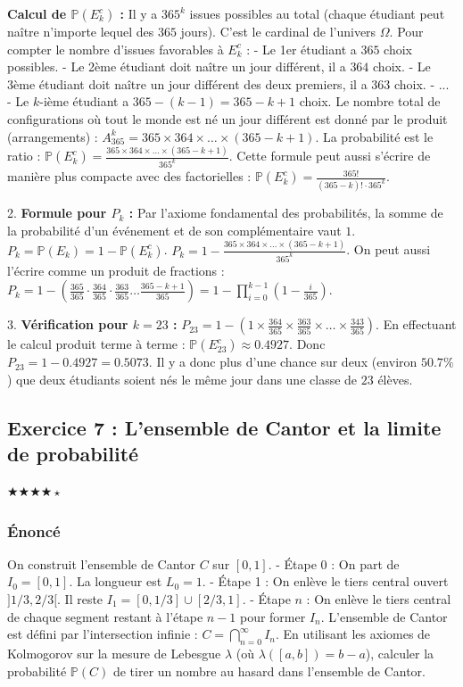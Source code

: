 \documentclass[11pt,a4paper]{article}
\begin{document}
\textbf{Calcul de $\mathbb{P}(E_k^c)$ :}
Il y a $365^k$ issues possibles au total (chaque étudiant peut naître n'importe lequel des $365$ jours). C'est le cardinal de l'univers $\Omega$.
Pour compter le nombre d'issues favorables à $E_k^c$ :
- Le 1er étudiant a $365$ choix possibles.
- Le 2ème étudiant doit naître un jour différent, il a $364$ choix.
- Le 3ème étudiant doit naître un jour différent des deux premiers, il a $363$ choix.
- ...
- Le $k$-ième étudiant a $365 - (k - 1) = 365 - k + 1$ choix.
Le nombre total de configurations où tout le monde est né un jour différent est donné par le produit (arrangements) : $A_{365}^k = 365 \times 364 \times \dots \times (365 - k + 1)$.
La probabilité est le ratio :
$\mathbb{P}(E_k^c) = \frac{365 \times 364 \times \dots \times (365 - k + 1)}{365^k}$.
Cette formule peut aussi s'écrire de manière plus compacte avec des factorielles :
$\mathbb{P}(E_k^c) = \frac{365!}{(365-k)! \cdot 365^k}$.

2. \textbf{Formule pour $P_k$ :}
Par l'axiome fondamental des probabilités, la somme de la probabilité d'un événement et de son complémentaire vaut $1$.
$P_k = \mathbb{P}(E_k) = 1 - \mathbb{P}(E_k^c)$.
$P_k = 1 - \frac{365 \times 364 \times \dots \times (365 - k + 1)}{365^k}$.
On peut aussi l'écrire comme un produit de fractions :
$P_k = 1 - \left( \frac{365}{365} \cdot \frac{364}{365} \cdot \frac{363}{365} \dots \frac{365 - k + 1}{365} \right) = 1 - \prod_{i=0}^{k-1} \left(1 - \frac{i}{365}\right)$.

3. \textbf{Vérification pour $k=23$ :}
$P_{23} = 1 - \left(1 \times \frac{364}{365} \times \frac{363}{365} \times \dots \times \frac{343}{365} \right)$.
En effectuant le calcul produit terme à terme :
$\mathbb{P}(E_{23}^c) \approx 0.4927$.
Donc $P_{23} = 1 - 0.4927 = 0.5073$.
Il y a donc plus d'une chance sur deux (environ $50.7\%$) que deux étudiants soient nés le même jour dans une classe de $23$ élèves.



\subsection*{Exercice 7 : L'ensemble de Cantor et la limite de probabilité}
$\bigstar\bigstar\bigstar\bigstar\star$

\subsubsection*{Énoncé}

On construit l'ensemble de Cantor $C$ sur $[0, 1]$.
- Étape 0 : On part de $I_0 = [0, 1]$. La longueur est $L_0 = 1$.
- Étape 1 : On enlève le tiers central ouvert $]1/3, 2/3[$. Il reste $I_1 = [0, 1/3] \cup [2/3, 1]$.
- Étape $n$ : On enlève le tiers central de chaque segment restant à l'étape $n-1$ pour former $I_n$.
L'ensemble de Cantor est défini par l'intersection infinie : $C = \bigcap_{n=0}^\infty I_n$.
En utilisant les axiomes de Kolmogorov sur la mesure de Lebesgue $\lambda$ (où $\lambda([a,b]) = b-a$), calculer la probabilité $\mathbb{P}(C)$ de tirer un nombre au hasard dans l'ensemble de Cantor.
\end{document}
